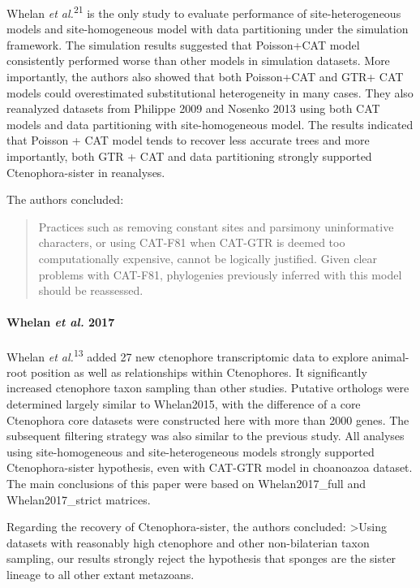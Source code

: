 \documentclass[]{article}
\let\oldparagraph\paragraph
\renewcommand{\paragraph}[1]{\oldparagraph{#1}\mbox{}}
\begin{document}
Whelan \emph{et al.}\textsuperscript{21} is the only study to evaluate
performance of site-heterogeneous models and site-homogeneous model with
data partitioning under the simulation framework. The simulation results
suggested that Poisson+CAT model consistently performed worse than other
models in simulation datasets. More importantly, the authors also showed
that both Poisson+CAT and GTR+ CAT models could overestimated
substitutional heterogeneity in many cases. They also reanalyzed
datasets from Philippe 2009 and Nosenko 2013 using both CAT models and
data partitioning with site-homogeneous model. The results indicated
that Poisson + CAT model tends to recover less accurate trees and more
importantly, both GTR + CAT and data partitioning strongly supported
Ctenophora-sister in reanalyses.

The authors concluded:

\begin{quote}
Practices such as removing constant sites and parsimony uninformative
characters, or using CAT-F81 when CAT-GTR is deemed too computationally
expensive, cannot be logically justified. Given clear problems with
CAT-F81, phylogenies previously inferred with this model should be
reassessed.
\end{quote}

\hypertarget{whelan-et-al.-2017}{%
\paragraph{\texorpdfstring{Whelan \emph{et al.}
2017}{Whelan et al. 2017}}\label{whelan-et-al.-2017}}

Whelan \emph{et al.}\textsuperscript{13} added 27 new ctenophore
transcriptomic data to explore animal-root position as well as
relationships within Ctenophores. It significantly increased ctenophore
taxon sampling than other studies. Putative orthologs were determined
largely similar to Whelan2015, with the difference of a core Ctenophora
core datasets were constructed here with more than 2000 genes. The
subsequent filtering strategy was also similar to the previous study.
All analyses using site-homogeneous and site-heterogeneous models
strongly supported Ctenophora-sister hypothesis, even with CAT-GTR model
in choanoazoa dataset. The main conclusions of this paper were based on
Whelan2017\_full and Whelan2017\_strict matrices.

Regarding the recovery of Ctenophora-sister, the authors concluded:
\textgreater{}Using datasets with reasonably high ctenophore and other
non-bilaterian taxon sampling, our results strongly reject the
hypothesis that sponges are the sister lineage to all other extant
metazoans.
\end{document}
